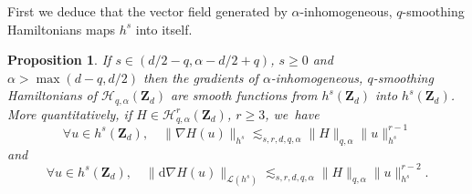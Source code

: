 \documentclass[JEP,XML,SOM,Unicode,NoEqCountersInSection,published]{cedram}
\newtheorem{proposition}[theorem]{Proposition}
\theoremstyle{definition}
\begin{document}
First we deduce that the vector field generated by $\alpha$-inhomogeneous, $q$-smoothing Hamiltonians maps $h^s$ into itself.
\begin{proposition}
\label{prop_vf}
If $s\in (d/2-q, \alpha-d/2+q)$, $s\geq 0$ and $\alpha >\max(d-q,d/2)$ then the gradients of $\alpha$-inhomogeneous, $q$-smoothing Hamiltonians of $ \mathscr{H}_{q,\alpha}(\mathbf{Z}_d)$ are smooth functions from $h^s(\mathbf{Z}_d)$ into $h^s(\mathbf{Z}_d)$. More quantitatively, if $H\in \mathscr{H}_{q,\alpha}^r(\mathbf{Z}_d)$, $r\geq 3$, we~have
\begin{equation}
\label{eq_cont_X}
\forall u \in h^s(\mathbf{Z}_d), \quad \|\nabla H(u)\|_{h^s} \lesssim_{s,r,d,q,\alpha} \| H \|_{q,\alpha} \|u\|_{h^s}^{r-1}
\end{equation}
and
\begin{equation}
\label{eq_cont_dX}
\forall u \in h^s(\mathbf{Z}_d), \quad \| \mathrm{d} \nabla H(u)\|_{\mathscr{L}(h^s)} \lesssim_{s,r,d,q,\alpha} \| H \|_{q,\alpha} \|u\|_{h^s}^{r-2}.
\end{equation}
\end{proposition}
\end{document}
